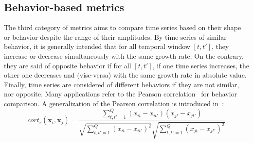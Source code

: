 

\subsection{Behavior-based metrics}

The third category of metrics aims to compare time series based on their shape or behavior despite the range of their amplitudes. By time series of similar behavior, it is generally intended that for all temporal window $[t,t']$, they increase or decrease simultaneously with the same growth rate. On the contrary, they are said of opposite behavior if for all $[t,t']$, if one time series increases, the other one decreases and (vise-versa) with the same growth rate in absolute value. Finally, time series are considered of different behaviors if they are not similar, nor opposite. Many applications refer to the Pearson correlation~\cite{Abraham2010a,Benesty2009} for behavior comparison. A generalization of the Pearson correlation is introduced in~\cite{AhlameDouzal-Chouakria2011}: 
\begin{equation}	
	cort_r(\textbf{x}_i,\textbf{x}_j) = 
	\frac{
		\sum\limits_{t,t'=1}^Q 
		{
			(x_{it}-x_{it'})
			(x_{jt}-x_{jt'})
		}
	}
	{
		\sqrt{
			\sum\limits_{t,t'=1}^Q  
			{(x_{it}-x_{it'})^2}
		} 
		\sqrt{
			\sum\limits_{t,t'=1}^Q  
			{(x_{jt}-x_{jt'})^2}
		} 	 
	}
\label{eq:corTr}
\end{equation}

